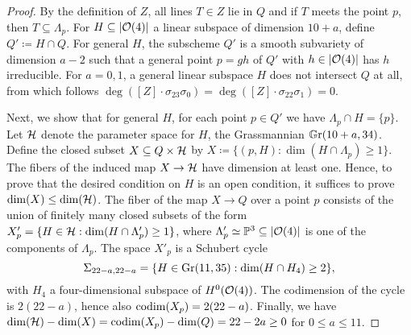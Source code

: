\begin{proof}
	By the definition of $Z$, all lines $T\in Z$ lie in $Q$ and if $T$ meets the point $p$, then $T\subseteq \Lambda_p$.
	For $H\subseteq\lvert\mathcal{O}(4)\rvert$ a linear subspace of dimension $10+a$, define $Q'\coloneqq H\cap Q$. For general $H$, the subscheme $Q'$ is a smooth subvariety of dimension $a-2$ such that a general point $p=gh$ of $Q'$ with $h\in \lvert\mathcal{O}(4)\rvert$ has $h$ irreducible.
	For $a=0,1$, a general linear subspace $H$ does not intersect $Q$ at all, from which follows $\deg([Z]\cdot \sigma_{23}\sigma_{0}) =
	\deg([Z]\cdot \sigma_{22}\sigma_{1}) = 0$.


	Next, we show that for general $H$, for each point $p\in Q'$ we have $\Lambda_p \cap H =\{p\}$. Let $\mathcal{H}$ denote the parameter space for $H$, \ie the Grassmannian $\mathbb G \mathrm r(10+a, 34)$. Define the closed subset $X\subseteq Q\times \mathcal{H}$ by
	$X\coloneqq \{(p,H):\dim(H\cap \Lambda_p)\geq 1\}$. The fibers of the induced map $X\to \mathcal{H}$ have dimension at least one. Hence, to prove that the desired condition on $H$ is an open condition, it suffices to prove $\dim(X) \leq \dim(\mathcal{H})$. The fiber of the map  $X\to Q$ over a point $p$ consists of the union of finitely many closed subsets of the form $X'_p = \{H\in \mathcal{H} : \dim(H\cap \Lambda'_p)\geq 1\}$, where $\Lambda'_p\simeq \mathbb{P}^3\subseteq \lvert\mathcal{O}(4)\rvert$ is one of the components of $\Lambda_p$. The space $X'_p$ is a Schubert cycle
	\[
		\Sigma_{22-a,22-a} = \{H\in \operatorname{Gr}(11,35) : \dim(H \cap H_4) \geq 2\},
	\]
	with $H_4$ a four-dimensional subspace of $H^0(\mathcal{O}(4))$. The codimension of the cycle is $2(22-a)$, hence also $\operatorname{codim}(X_p) = 2(22-a)$. Finally, we have $\dim(\mathcal{H})-\dim(X) = \operatorname{codim}(X_p) - \dim(Q) = 22-2a \geq 0$ for $0\leq a \leq 11$.


\end{proof}
